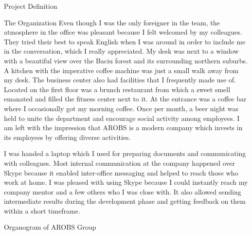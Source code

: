 \documentclass{matthijs}
\begin{document}
\begin{hoofdstuk}{Project Definition}
\begin{paragraaf}{The Organization}
			Even though I was the only foreigner in the team, the atmosphere in the office was pleasant because I felt welcomed by my colleagues.
			They tried their best to speak English when I was around in order to include me in the conversation, which I really appreciated.
			My desk was next to a window with a beautiful view over the Baciu forest and its surrounding northern suburbs.
			A kitchen with the imperative coffee machine was just a small walk away from my desk.
			The business center also had facilities that I frequently made use of.
			Located on the first floor was a brunch restaurant from which a sweet smell emanated and filled the fitness center next to it.
			At the entrance was a coffee bar where I occasionally got my morning coffee.
			Once per month, a beer night was held to unite the department and encourage social activity among employees.
			I am left with the impression that AROBS is a modern company which invests in its employees by offering diverse activities.

			\noindent I was handed a laptop which I used for preparing documents and communicating with colleagues.
			Most internal communication at the company happened over Skype because it enabled inter-office messaging and helped to reach those who work at home.
			I was pleased with using Skype because I could instantly reach my company mentor and a few others who I was close with.
			It also allowed sending intermediate results during the development phase and getting feedback on them within a short timeframe.

			\vspace{1ex}
			\begin{figuur}{Organogram of AROBS Group}
				\centerline{
					}
\end{figuur}
\end{paragraaf}
\end{hoofdstuk}
\end{document}
